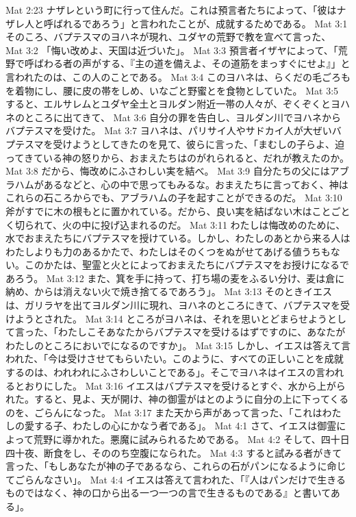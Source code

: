 Mat 2:23  ナザレという町に行って住んだ。これは預言者たちによって、「彼はナザレ人と呼ばれるであろう」と言われたことが、成就するためである。
Mat 3:1  そのころ、バプテスマのヨハネが現れ、ユダヤの荒野で教を宣べて言った、
Mat 3:2  「悔い改めよ、天国は近づいた」。
Mat 3:3  預言者イザヤによって、「荒野で呼ばわる者の声がする、『主の道を備えよ、その道筋をまっすぐにせよ』」と言われたのは、この人のことである。
Mat 3:4  このヨハネは、らくだの毛ごろもを着物にし、腰に皮の帯をしめ、いなごと野蜜とを食物としていた。
Mat 3:5  すると、エルサレムとユダヤ全土とヨルダン附近一帯の人々が、ぞくぞくとヨハネのところに出てきて、
Mat 3:6  自分の罪を告白し、ヨルダン川でヨハネからバプテスマを受けた。
Mat 3:7  ヨハネは、パリサイ人やサドカイ人が大ぜいバプテスマを受けようとしてきたのを見て、彼らに言った、「まむしの子らよ、迫ってきている神の怒りから、おまえたちはのがれられると、だれが教えたのか。
Mat 3:8  だから、悔改めにふさわしい実を結べ。
Mat 3:9  自分たちの父にはアブラハムがあるなどと、心の中で思ってもみるな。おまえたちに言っておく、神はこれらの石ころからでも、アブラハムの子を起すことができるのだ。
Mat 3:10  斧がすでに木の根もとに置かれている。だから、良い実を結ばない木はことごとく切られて、火の中に投げ込まれるのだ。
Mat 3:11  わたしは悔改めのために、水でおまえたちにバプテスマを授けている。しかし、わたしのあとから来る人はわたしよりも力のあるかたで、わたしはそのくつをぬがせてあげる値うちもない。このかたは、聖霊と火とによっておまえたちにバプテスマをお授けになるであろう。
Mat 3:12  また、箕を手に持って、打ち場の麦をふるい分け、麦は倉に納め、からは消えない火で焼き捨てるであろう」。
Mat 3:13  そのときイエスは、ガリラヤを出てヨルダン川に現れ、ヨハネのところにきて、バプテスマを受けようとされた。
Mat 3:14  ところがヨハネは、それを思いとどまらせようとして言った、「わたしこそあなたからバプテスマを受けるはずですのに、あなたがわたしのところにおいでになるのですか」。
Mat 3:15  しかし、イエスは答えて言われた、「今は受けさせてもらいたい。このように、すべての正しいことを成就するのは、われわれにふさわしいことである」。そこでヨハネはイエスの言われるとおりにした。
Mat 3:16  イエスはバプテスマを受けるとすぐ、水から上がられた。すると、見よ、天が開け、神の御霊がはとのように自分の上に下ってくるのを、ごらんになった。
Mat 3:17  また天から声があって言った、「これはわたしの愛する子、わたしの心にかなう者である」。
Mat 4:1  さて、イエスは御霊によって荒野に導かれた。悪魔に試みられるためである。
Mat 4:2  そして、四十日四十夜、断食をし、そののち空腹になられた。
Mat 4:3  すると試みる者がきて言った、「もしあなたが神の子であるなら、これらの石がパンになるように命じてごらんなさい」。
Mat 4:4  イエスは答えて言われた、「『人はパンだけで生きるものではなく、神の口から出る一つ一つの言で生きるものである』と書いてある」。
